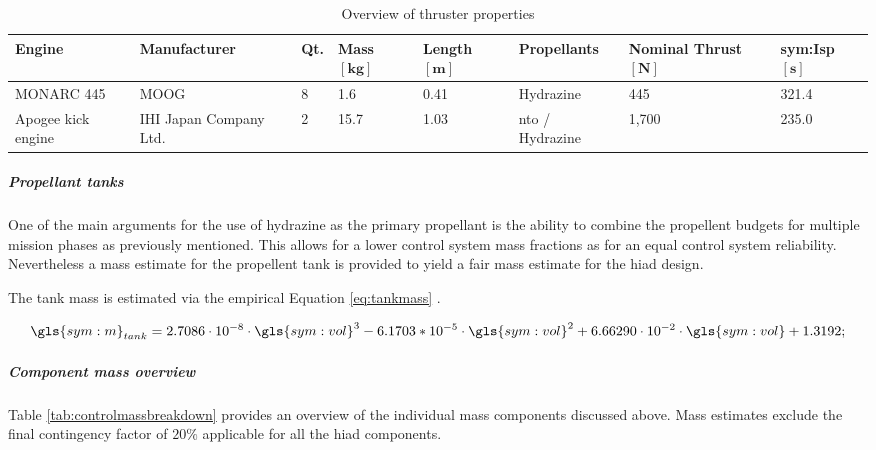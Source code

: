\begin{table}[H]
	\centering
\caption{Overview of thruster properties}
\label{tab:thrusters}
\hspace{-5mm}
\begin{tabular}{|p{}|p{}|p{}|p{}|p{}|p{}|p{}|l|} \hline 
\textbf{Engine    }          &\textbf{ Manufacturer }         & \textbf{Qt.} &\textbf{Mass $\mathbf{[kg]}$}      & \textbf{Length $\mathbf{[m]}$} & \textbf{Propellants}  & \textbf{Nominal Thrust $\mathbf{[N]}$} & \textbf{\gls{sym:Isp} $\mathbf{[s]}$} \\ \hline \hline
MONARC 445          & MOOG                  & 8        & 1.6  & 0.41 & Hydrazine     & 445         & 321.4   \\ \hline
Apogee kick engine & IHI Japan Company Ltd. & 2        & 15.7 & 1.03 & \gls{nto} / Hydrazine & 1,700        & 235.0     \\ \hline
\end{tabular}
\end{table}


\subparagraph{Propellant tanks}
One of the main arguments for the use of hydrazine as the primary propellant is the ability to combine the propellent budgets for multiple mission phases as previously mentioned. This allows for a lower control system mass fractions as for an equal control system reliability. Nevertheless a mass estimate for the propellent tank is provided to yield a fair mass estimate for the \gls{hiad} design. 

The tank mass is estimated via the empirical Equation \ref{eq:tankmass} \cite[p. 543]{Wertz2011}.

\begin{equation}
\label{eq:tankmass} 
\gls{sym:m}_{tank}=2.7086 \cdot 10^{-8} \cdot \gls{sym:vol}^3 -6.1703*10^{-5} \cdot \gls{sym:vol}^2 +6.66290 \cdot 10^{-2}  \cdot \gls{sym:vol} +1.3192;
\end{equation}

\subparagraph{Component mass overview}

Table \ref{tab:controlmassbreakdown} provides an overview of the individual mass components discussed above. Mass estimates exclude the final contingency factor of $20\%$ applicable for all the \gls{hiad} components.


